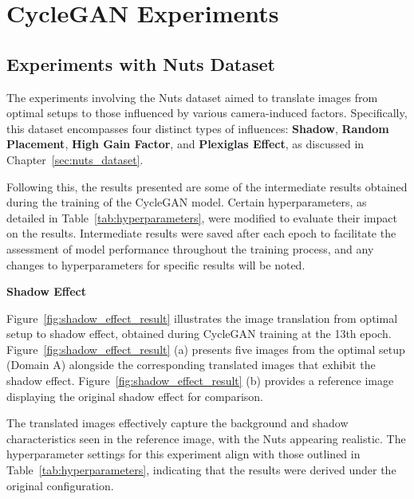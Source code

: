 \documentclass[12pt,DIV14,BCOR12mm,a4paper,footinclude=false,headinclude,parskip=half-,twoside,openright,cleardoublepage=empty,toc=index,bibliography=totoc,listof=totoc]{scrreprt}
\numberwithin{equation}{chapter}
\begin{document}
\section{CycleGAN Experiments}

\subsection{Experiments with Nuts Dataset}
\label{sec:cyclegan_nuts}
The experiments involving the Nuts dataset aimed to translate images from optimal setups to those influenced by various camera-induced factors. Specifically, this dataset encompasses four distinct types of influences: \textbf{Shadow}, \textbf{Random Placement}, \textbf{High Gain Factor}, and \textbf{Plexiglas Effect}, as discussed in Chapter~\ref{sec:nuts_dataset}.

Following this, the results presented are some of the intermediate results obtained during the training of the CycleGAN model. Certain hyperparameters, as detailed in Table~\ref{tab:hyperparameters}, were modified to evaluate their impact on the results. Intermediate results were saved after each epoch to facilitate the assessment of model performance throughout the training process, and any changes to hyperparameters for specific results will be noted.

\textbf{Shadow Effect}

Figure~\ref{fig:shadow_effect_result} illustrates the image translation from optimal setup to shadow effect, obtained during CycleGAN training at the 13th epoch. Figure~\ref{fig:shadow_effect_result} (a) presents five images from the optimal setup (Domain A) alongside the corresponding translated images that exhibit the shadow effect. Figure~\ref{fig:shadow_effect_result} (b) provides a reference image displaying the original shadow effect for comparison.

The translated images effectively capture the background and shadow characteristics seen in the reference image, with the Nuts appearing realistic. The hyperparameter settings for this experiment align with those outlined in Table~\ref{tab:hyperparameters}, indicating that the results were derived under the original configuration.
\end{document}
